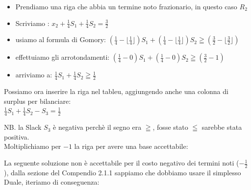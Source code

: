 \documentclass{article}
\begin{document}
\begin{itemize}
\item Prendiamo una riga che abbia un termine noto frazionario, in questo caso $R_2$
\item Scriviamo : $x_2 + \frac{1}{4} S_1 + \frac{1}{4} S_2 = \frac{3}{2}$
\item usiamo al formula di Gomory: $  ( \frac{1}{4} - \lfloor \frac{1}{4} \rfloor )S_1 +  ( \frac{1}{4} - \lfloor \frac{1}{4} \rfloor )S_2 \geqq ( \frac{3}{2} - \lfloor \frac{3}{2} \rfloor )$
\item effettuiamo gli arrotondamenti: $  ( \frac{1}{4} - 0 )S_1 +  ( \frac{1}{4} - 0 )S_2 \geqq ( \frac{3}{2} - 1 )$
\item arriviamo a: $\frac{1}{4}S_1 + \frac{1}{4}S_2 \geqq \frac{1}{2}$
\end{itemize}

Possiamo ora inserire la riga nel tableu, aggiungendo anche una colonna di surplus per bilanciare:\\

$\frac{1}{4}S_1 + \frac{1}{4}S_2 -S_3 = \frac{1}{2}$

NB. la Slack $S_3$ è negativa perchè il segno era $\geqq$, fosse stato $\leqq$ sarebbe stata positiva.\\
Moltiplichiamo per $-1$ la riga per avere una base accettabile:\\
\begin{center}
\end{center}

La seguente soluzione non è accettabile per il costo negativo dei termini noti ($-\frac{1}{2}$), dalla sezione del Compendio 2.1.1 sappiamo che dobbiamo usare il simplesso Duale, iteriamo di conseguenza:\\

\begin{center}
\end{center}
\end{document}
